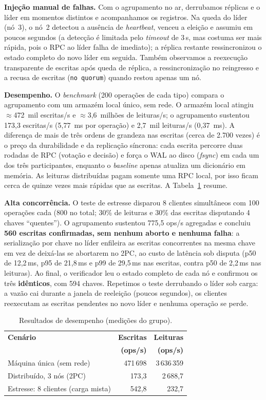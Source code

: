 \documentclass[10pt,twocolumn]{article}
\begin{document}
\textbf{Injeção manual de falhas.} Com o agrupamento no ar, derrubamos
réplicas e o líder em momentos distintos e acompanhamos os registros. Na
queda do líder (nó~3), o nó~2 detectou a ausência de \emph{heartbeat},
venceu a eleição e assumiu em poucos segundos (a detecção é limitada
pelo \emph{timeout} de 3\,s, mas costuma ser mais rápida, pois o RPC ao
líder falha de imediato); a réplica restante ressincronizou o estado
completo do novo líder em seguida. Também observamos a reexecução
transparente de escritas após queda de réplica, a ressincronização no
reingresso e a recusa de escritas (\texttt{no quorum}) quando restou
apenas um nó.

\textbf{Desempenho.} O \emph{benchmark} (200 operações de cada tipo)
compara o agrupamento com um armazém local único, sem rede. O armazém
local atingiu $\approx$472~mil escritas/s e $\approx$3{,}6~milhões de
leituras/s; o agrupamento sustentou 173{,}3 escritas/s (5{,}77~ms por
operação) e 2{,}7~mil leituras/s (0{,}37~ms). A diferença de mais de três
ordens de grandeza nas escritas (cerca de 2{.}700 vezes) é o preço da
durabilidade e da replicação síncrona: cada escrita percorre duas rodadas
de RPC (votação e decisão) e força o WAL ao disco (\emph{fsync}) em cada um
dos três participantes, enquanto o \emph{baseline} apenas atualiza um
dicionário em memória. As leituras distribuídas pagam somente uma RPC
local, por isso ficam cerca de quinze vezes mais rápidas que as escritas.
A Tabela~\ref{tab:perf} resume.

\textbf{Alta concorrência.} O teste de estresse disparou 8 clientes
simultâneos com 100 operações cada (800 no total; 30\% de leituras e
30\% das escritas disputando 4 chaves ``quentes''). O agrupamento
sustentou 775{,}5 ops/s agregadas e concluiu \textbf{560 escritas
confirmadas, sem nenhum aborto e nenhuma falha}: a serialização por chave
no líder enfileira as escritas concorrentes na mesma chave em vez de
deixá-las se abortarem no 2PC, ao custo de latência sob disputa
(p50 de 12{,}2\,ms, p95 de 21{,}8\,ms e p99 de 29{,}5\,ms nas escritas,
contra p50 de 2{,}2\,ms nas leituras). Ao final, o verificador leu o estado
completo de cada nó e confirmou os três \textbf{idênticos}, com 594
chaves. Repetimos o teste derrubando o líder sob carga: a vazão cai durante
a janela de reeleição (poucos segundos), os clientes reexecutam as escritas
pendentes no novo líder e nenhuma operação se perde.

\begin{table}[ht]
\centering
\caption{Resultados de desempenho (medições do grupo).}
\label{tab:perf}
\small
\begin{tabular}{lrr}
\hline
\textbf{Cenário} & \textbf{Escritas} & \textbf{Leituras}\\
 & \textbf{(ops/s)} & \textbf{(ops/s)}\\
\hline
Máquina única (sem rede)          & 471\,698 & 3\,636\,359\\
Distribuído, 3 nós (2PC)          & 173{,}3  & 2\,688{,}7\\
Estresse: 8 clientes (carga mista) & 542{,}8 & 232{,}7\\
\hline
\end{tabular}
\end{table}
\end{document}
